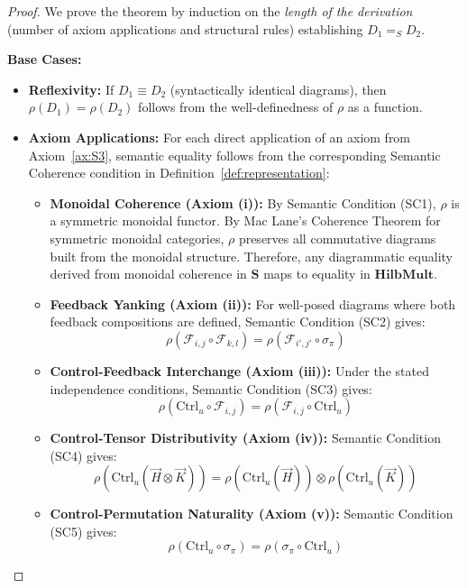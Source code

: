 \documentclass[11pt]{article}
\begin{document}
\begin{proof}
We prove the theorem by induction on the \emph{length of the derivation} (number of axiom applications and structural rules) establishing $D_1 =_{S} D_2$.

\noindent\textbf{Base Cases:}

\begin{itemize}
    \item \textbf{Reflexivity:} If $D_1 \equiv D_2$ (syntactically identical diagrams), then $\rho(D_1) = \rho(D_2)$ follows from the well-definedness of $\rho$ as a function.
    
    \item \textbf{Axiom Applications:} For each direct application of an axiom from Axiom~\ref{ax:S3}, semantic equality follows from the corresponding Semantic Coherence condition in Definition~\ref{def:representation}:
    \begin{itemize}
        \item \textbf{Monoidal Coherence (Axiom (i)):} By Semantic Condition (SC1), $\rho$ is a symmetric monoidal functor. By Mac Lane's Coherence Theorem for symmetric monoidal categories, $\rho$ preserves all commutative diagrams built from the monoidal structure. Therefore, any diagrammatic equality derived from monoidal coherence in $\mathbf{S}$ maps to equality in $\mathbf{HilbMult}$.
        
        \item \textbf{Feedback Yanking (Axiom (ii)):} For well-posed diagrams where both feedback compositions are defined, Semantic Condition (SC2) gives:
        \[
        \rho(\mathcal{F}_{i,j} \circ \mathcal{F}_{k,l}) = \rho(\mathcal{F}_{i',j'} \circ \sigma_{\pi})
        \]
        
        \item \textbf{Control-Feedback Interchange (Axiom (iii)):} Under the stated independence conditions, Semantic Condition (SC3) gives:
        \[
        \rho(\mathrm{Ctrl}_u \circ \mathcal{F}_{i,j}) = \rho(\mathcal{F}_{i,j} \circ \mathrm{Ctrl}_u)
        \]
        
        \item \textbf{Control-Tensor Distributivity (Axiom (iv)):} Semantic Condition (SC4) gives:
        \[
        \rho(\mathrm{Ctrl}_u(\vec{H} \otimes \vec{K})) = \rho(\mathrm{Ctrl}_u(\vec{H})) \otimes \rho(\mathrm{Ctrl}_u(\vec{K}))
        \]
        
        \item \textbf{Control-Permutation Naturality (Axiom (v)):} Semantic Condition (SC5) gives:
        \[
        \rho(\mathrm{Ctrl}_u \circ \sigma_{\pi}) = \rho(\sigma_{\pi} \circ \mathrm{Ctrl}_u)
        \]
        

\end{itemize}
\end{itemize}
\end{proof}
\end{document}
